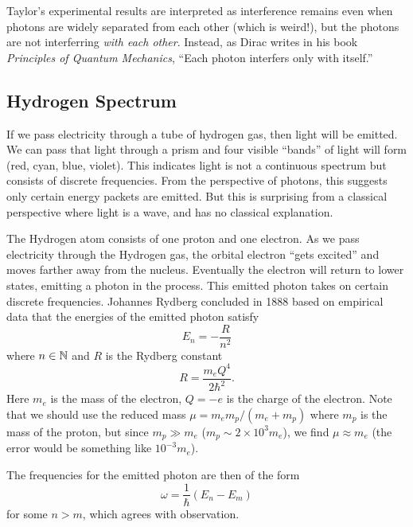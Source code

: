 Taylor's experimental results are interpreted as interference remains
even when photons are widely separated from each other (which is
weird!), but the photons are not interferring \emph{with each other}.
Instead, as Dirac writes in his book \textit{Principles of Quantum Mechanics},
``Each photon interfers only with itself.''

\subsection{Hydrogen Spectrum}

If we pass electricity through a tube of hydrogen gas, then light will
be emitted. We can pass that light through a prism and four visible
``bands'' of light will form (red, cyan, blue, violet). This indicates
light is not a continuous spectrum but consists of discrete
frequencies. From the perspective of photons, this suggests only certain
energy packets are emitted. But this is surprising from a classical
perspective where light is a wave, and has no classical explanation.

The Hydrogen atom consists of one proton and one electron. As we pass
electricity through the Hydrogen gas, the orbital electron ``gets
excited'' and moves farther away from the nucleus. Eventually the
electron will return to lower states, emitting a photon in the
process. This emitted photon takes on certain discrete
frequencies. Johannes Rydberg concluded in 1888 based on empirical data
that the energies of the emitted photon satisfy
\begin{equation}
E_{n} = -\frac{R}{n^{2}}
\end{equation}
where $n\in\mathbb{N}$ and $R$ is the Rydberg constant
\begin{equation}
R = \frac{m_{e}Q^{4}}{2\hbar^{2}}.
\end{equation}
Here $m_{e}$ is the mass of the electron, $Q=-e$ is the charge of the
electron.
Note that we should use the reduced mass $\mu=m_{e}m_{p}/(m_{e}+m_{p})$
where $m_{p}$ is the mass of the proton,
but since $m_{p}\gg m_{e}$ ($m_{p}\sim 2\times10^{3}m_{e}$), we find
$\mu\approx m_{e}$ (the error would be something like $10^{-3}m_{e}$).

The frequencies for the emitted photon are then of the form
\begin{equation}
\omega = \frac{1}{\hbar}(E_{n} - E_{m})
\end{equation}
for some $n>m$, which agrees with observation.

